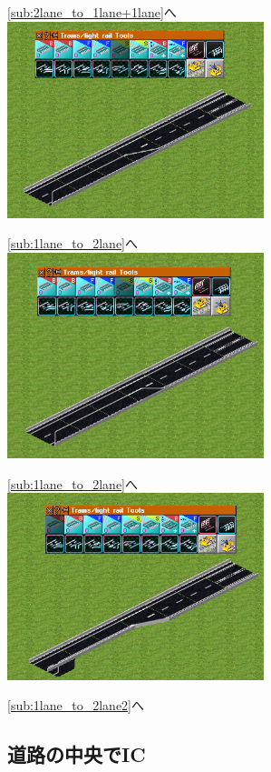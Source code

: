\documentclass{jbook}
\begin{document}
  \ref{sub:2lane_to_1lane+1lane}へ\\

  \includegraphics[width = 75mm]{picture/20210214-road-4-6.png}

  \ref{sub:1lane_to_2lane}へ\\

  \includegraphics[width = 75mm]{picture/20210214-road-4-7.png}

  \ref{sub:1lane_to_2lane}へ\\

\includegraphics[width = 75mm]{picture/20210214-road-5-5.png}

  \ref{sub:1lane_to_2lane2}へ\\

\newpage

\subsection{道路の中央でIC}
\label{sub:IC_at_center}
\end{document}
